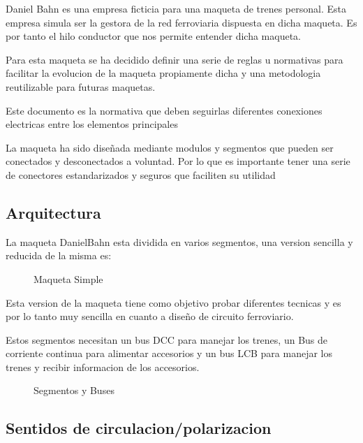 Daniel Bahn es una empresa ficticia para una maqueta de trenes personal. Esta empresa simula ser la gestora de la red ferroviaria dispuesta en dicha maqueta.
Es por tanto el hilo conductor que nos permite entender dicha maqueta.

Para esta maqueta se ha decidido definir una serie de reglas u normativas para facilitar la evolucion de la maqueta propiamente dicha y una metodologia
reutilizable para futuras maquetas.

Este documento es la normativa que deben seguirlas diferentes conexiones electricas entre los elementos principales

La maqueta ha sido diseñada mediante modulos y segmentos que pueden ser conectados y desconectados a voluntad.
Por lo que es importante tener una serie de conectores estandarizados y seguros que faciliten su utilidad

\subsection{Arquitectura}
La maqueta DanielBahn esta dividida en varios segmentos, una version sencilla y reducida
 de la misma es:

\begin{figure}[H]
    \centering
    
    \caption{Maqueta Simple}
    \label{fig:MaquetaSimple}
\end{figure}

Esta version de la maqueta tiene como objetivo probar diferentes tecnicas
y es por lo tanto muy sencilla en cuanto a diseño de circuito ferroviario.

Estos segmentos necesitan un bus DCC para manejar los trenes, un Bus de corriente
continua para alimentar accesorios y un bus LCB para 
manejar los trenes y recibir informacion de los accesorios.

\begin{figure}[H]
    \centering
    
    \caption{Segmentos y Buses}
    \label{fig:ModulosBuses}
\end{figure}

\subsection{Sentidos de circulacion/polarizacion}

